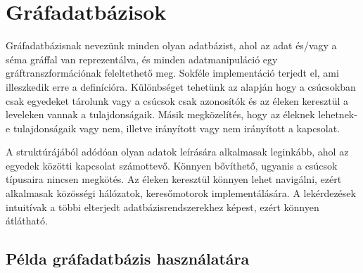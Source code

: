 \chapter{Gráfadatbázisok}

Gráfadatbázisnak nevezünk minden olyan adatbázist, ahol az adat és/vagy a séma gráffal van reprezentálva, és minden adatmanipuláció egy gráftranszformációnak feleltethető meg. Sokféle implementáció terjedt el, ami illeszkedik erre a definícióra. Különbséget tehetünk az alapján hogy a csúcsokban csak egyedeket tárolunk vagy a csúcsok csak azonosítók és az éleken keresztül a leveleken vannak a tulajdonságaik. Másik megközelítés, hogy az éleknek lehetnek-e tulajdonságaik vagy nem, illetve irányított vagy nem irányított a kapcsolat. 

A struktúrájából adódóan olyan adatok leírására alkalmasak leginkább, ahol az egyedek közötti kapcsolat számottevő. Könnyen bővíthető, ugyanis a csúcsok típusaira nincsen megkötés. Az éleken keresztül könnyen lehet navigálni, ezért alkalmasak közösségi hálózatok, keresőmotorok implementálására. A lekérdezések intuitívak a többi elterjedt adatbázisrendszerekhez képest, ezért könnyen átlátható.

\section{Példa gráfadatbázis használatára}

